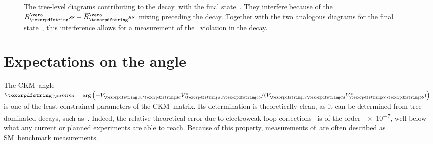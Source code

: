 \begin{figure}[hb]
    \caption{
        The tree-level diagrams contributing to the decay~\BsDsK with the final state~\DsmKp.
        They interfere because of the \({\Bs-\Bsb}\)~mixing preceding the decay.
        Together with the two analogous diagrams for the final state~\DspKm, this interference allows for a measurement of the \CP~violation in the decay.}
    \label{fig:theory_Topology_BsDsK}
\end{figure}

\clearpage
\section{Expectations on the angle~\CPgamma}
\label{sec:Gamma}

The CKM~angle~\({\CPgamma = \arg\left(-\Vud\Vubs/(\Vcd\Vcbs)\right)}\) is one of the least-constrained parameters of the CKM~matrix.
Its determination is theoretically clean, as it can be determined from tree-dominated decays, such as~\BsDsK.
Indeed, the relative theoretical error due to electroweak loop corrections~\cite{Brod:2013sga} is of the order~\num{e-7}, well below what any current or planned experiments are able to reach.
Because of this property, measurements of~\CPgamma are often described as SM~benchmark measurements.

